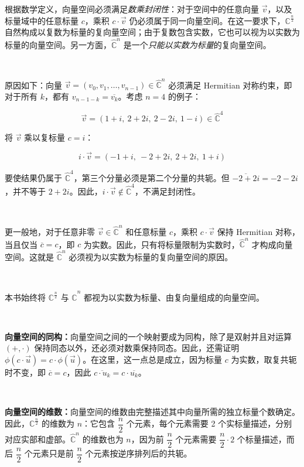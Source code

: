 \begin{tcolorbox}[title={\textbf{以实数或复数为标量的复向量空间}}]

根据数学定义，向量空间必须满足\textit{数乘封闭性}：对于空间中的任意向量 $\vec{v}$，以及标量域中的任意标量 $c$，乘积 $c \cdot \vec{v}$ 仍必须属于同一向量空间。在这一要求下，$\mathbb{C}^{\frac{n}{2}}$ 自然构成以复数为标量的复向量空间；由于复数包含实数，它也可以视为以实数为标量的向量空间。另一方面，$\hat{\mathbb{C}}^{n}$ 是一个\textit{只能以实数为标量}的复向量空间。

$ $

原因如下：向量 $\vec{v} = (v_0, v_1, \dots, v_{n-1}) \in \hat{\mathbb{C}}^n$ 必须满足 Hermitian 对称约束，即对于所有 $k$，都有 $v_{n-1-k} = \overline{v_k}$。考虑 $n = 4$ 的例子：

$$\vec{v} = (1+i,\ 2+2i,\ 2-2i,\ 1-i) \in \hat{\mathbb{C}}^4$$

将 $\vec{v}$ 乘以复标量 $c = i$：

$$i \cdot \vec{v} = (-1+i,\ -2+2i,\ 2+2i,\ 1+i)$$

要使结果仍属于 $\hat{\mathbb{C}}^4$，第三个分量必须是第二个分量的共轭。但 $\overline{-2+2i} = -2-2i$，并不等于 $2+2i$。因此，$i \cdot \vec{v} \notin \hat{\mathbb{C}}^4$，不满足封闭性。

$ $

更一般地，对于任意非零 $\vec{v} \in \hat{\mathbb{C}}^n$ 和任意标量 $c$，乘积 $c \cdot \vec{v}$ 保持 Hermitian 对称，当且仅当 $\overline{c} = c$，即 $c$ 为实数。因此，只有将标量限制为实数时，$\hat{\mathbb{C}}^n$ 才构成向量空间。这就是 $\hat{\mathbb{C}}^n$ 必须视为以实数为标量的复向量空间的原因。

$ $

本书始终将 $\mathbb{C}^{\frac{n}{2}}$ 与 $\hat{\mathbb{C}}^{n}$ 都视为以实数为标量、由复向量组成的向量空间。

$ $

\textbf{向量空间的同构：}向量空间之间的一个映射要成为同构，除了是双射并且对运算 $(+, \cdot)$ 保持同态以外，还必须对数乘保持同态。因此，还需证明 $\phi(c \cdot \vec{u}) = c \cdot \phi(\vec{u})$。在这里，这一点总是成立，因为标量 $c$ 为实数，取复共轭时不变，即 $\overline{c} = c$，因此 $\overline{c \cdot u_k} = c \cdot \overline{u_k}$。

$ $

\textbf{向量空间的维数：}向量空间的维数由完整描述其中向量所需的独立标量个数确定。因此，$\mathbb{C}^{\frac{n}{2}}$ 的维数为 $n$：它包含 $\dfrac{n}{2}$ 个元素，每个元素需要 2 个实标量描述，分别对应实部和虚部。$\hat{\mathbb{C}}^{n}$ 的维数也为 $n$，因为前 $\dfrac{n}{2}$ 个元素需要 $\dfrac{n}{2}\cdot 2$ 个标量描述，而后 $\dfrac{n}{2}$ 个元素只是前 $\dfrac{n}{2}$ 个元素按逆序排列后的共轭。

\end{tcolorbox}


